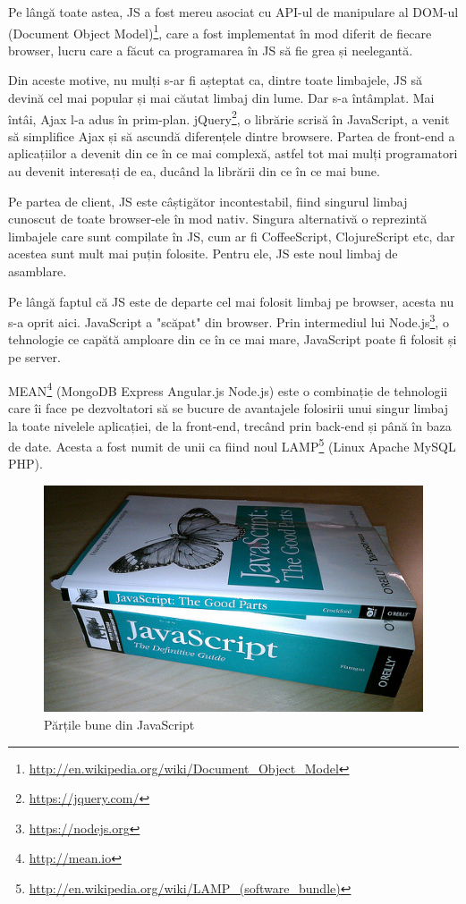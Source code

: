 Pe lângă toate astea, JS a fost mereu asociat cu API-ul de manipulare al DOM-ul 
(Document Object Model)\footnote{\url{http://en.wikipedia.org/wiki/Document\_Object\_Model}},
care a fost implementat în mod diferit
de fiecare browser, lucru care a făcut ca programarea în JS să fie
grea și neelegantă.

Din aceste motive, nu mulți s-ar fi așteptat ca, dintre toate
limbajele, JS să devină cel mai popular și mai căutat limbaj din
lume. Dar s-a întâmplat. Mai întâi, Ajax l-a adus în prim-plan.
jQuery\footnote{\url{https://jquery.com/}}, o librărie scrisă în JavaScript, a venit să simplifice 
Ajax și să ascundă diferențele dintre
browsere. Partea de front-end a aplicațiilor a devenit din ce
în ce mai complexă, astfel tot mai mulți programatori au
devenit interesați de ea, ducând la librării din ce în ce mai bune.

Pe partea de client, JS este câștigător incontestabil, fiind
singurul limbaj cunoscut de toate browser-ele în mod nativ.
Singura alternativă o reprezintă limbajele care sunt compilate
în JS, cum ar fi CoffeeScript, ClojureScript etc, dar acestea
sunt mult mai puțin folosite. Pentru ele, JS este
noul limbaj de asamblare.

Pe lângă faptul că JS este de departe cel mai folosit limbaj
pe browser, acesta nu s-a oprit aici. JavaScript a "scăpat" din browser.
Prin intermediul lui Node.js\footnote{\url{https://nodejs.org}}, 
o tehnologie ce capătă amploare 
din ce în ce mai mare, JavaScript poate fi folosit
și pe server. 

MEAN\footnote{\url{http://mean.io}} (MongoDB Express Angular.js Node.js) 
este o combinație de tehnologii
care îi face pe dezvoltatori să se bucure de avantajele folosirii
unui singur limbaj la toate nivelele aplicației, de la front-end,
trecând prin back-end și până în baza de date. Acesta a fost numit
de unii ca fiind noul 
LAMP\footnote{\url{http://en.wikipedia.org/wiki/LAMP\_(software\_bundle)}}
(Linux Apache MySQL PHP).

\begin{figure}[t]
  \centering
    \includegraphics[width=1\textwidth]{./chap3-code/js}
  \caption{Părțile bune din JavaScript}
\end{figure}

